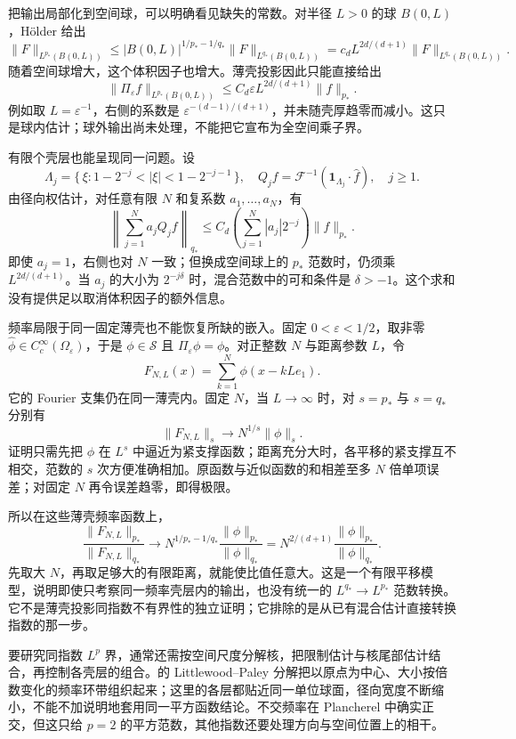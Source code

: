 \ProseParagraphBreak
把输出局部化到空间球，可以明确看见缺失的常数。对半径 \(L>0\) 的球 \(B(0,L)\)，Hölder 给出
\[
 \|F\|_{L^{p_*}(B(0,L))}
 \leq |B(0,L)|^{1/p_*-1/q_*}
       \|F\|_{L^{q_*}(B(0,L))}
 =c_d L^{2d/(d+1)}\|F\|_{L^{q_*}(B(0,L))}.
\]
随着空间球增大，这个体积因子也增大。薄壳投影因此只能直接给出
\[
 \|\Pi_\varepsilon f\|_{L^{p_*}(B(0,L))}
 \leq C_d\varepsilon L^{2d/(d+1)}\|f\|_{p_*}.
\]
例如取 \(L=\varepsilon^{-1}\)，右侧的系数是
\(\varepsilon^{-(d-1)/(d+1)}\)，并未随壳厚趋零而减小。这只是球内估计；球外输出尚未处理，不能把它宣布为全空间乘子界。

\ProseParagraphBreak
有限个壳层也能呈现同一问题。设
\[
 \Lambda_j
 =\{\,\xi:1-2^{-j}<|\xi|<1-2^{-j-1}\,\},\quad
 Q_jf=\mathcal F^{-1}(\mathbf1_{\Lambda_j}\cdot\widehat f),
 \quad j\geq1.
\]
由径向权估计，对任意有限 \(N\) 和复系数 \(a_1,\ldots,a_N\)，有
\[
 \left\|\sum_{j=1}^N a_jQ_jf\right\|_{q_*}
 \leq C_d\left(\sum_{j=1}^N|a_j|2^{-j}\right)\|f\|_{p_*}.
\]
即使 \(a_j=1\)，右侧也对 \(N\) 一致；但换成空间球上的 \(p_*\) 范数时，仍须乘 \(L^{2d/(d+1)}\)。当 \(a_j\) 的大小为 \(2^{-j\delta}\) 时，混合范数中的可和条件是 \(\delta>-1\)。这个求和没有提供足以取消体积因子的额外信息。

\ProseParagraphBreak
频率局限于同一固定薄壳也不能恢复所缺的嵌入。固定 \(0<\varepsilon<1/2\)，取非零
\(\widehat\phi\in C_c^\infty(\Omega_\varepsilon)\)，于是 \(\phi\in\mathcal S\) 且 \(\Pi_\varepsilon\phi=\phi\)。对正整数 \(N\) 与距离参数 \(L\)，令
\[
 F_{N,L}(x)=\sum_{k=1}^N\phi(x-kLe_1).
\]
它的 Fourier 支集仍在同一薄壳内。固定 \(N\)，当 \(L\to\infty\) 时，对 \(s=p_*\) 与 \(s=q_*\) 分别有
\[
 \|F_{N,L}\|_s\longrightarrow N^{1/s}\|\phi\|_s.
\]
证明只需先把 \(\phi\) 在 \(L^s\) 中逼近为紧支撑函数；距离充分大时，各平移的紧支撑互不相交，范数的 \(s\) 次方便准确相加。原函数与近似函数的和相差至多 \(N\) 倍单项误差；对固定 \(N\) 再令误差趋零，即得极限。

\ProseParagraphBreak
所以在这些薄壳频率函数上，
\[
 \frac{\|F_{N,L}\|_{p_*}}{\|F_{N,L}\|_{q_*}}
 \longrightarrow
 N^{1/p_*-1/q_*}\frac{\|\phi\|_{p_*}}{\|\phi\|_{q_*}}
 =N^{2/(d+1)}\frac{\|\phi\|_{p_*}}{\|\phi\|_{q_*}}.
\]
先取大 \(N\)，再取足够大的有限距离，就能使比值任意大。这是一个有限平移模型，说明即使只考察同一频率壳层内的输出，也没有统一的 \(L^{q_*}\to L^{p_*}\) 范数转换。它不是薄壳投影同指数不有界性的独立证明；它排除的是从已有混合估计直接转换指数的那一步。

\ProseParagraphBreak
要研究同指数 \(L^p\) 界，通常还需按空间尺度分解核，把限制估计与核尾部估计结合，再控制各壳层的组合。的 Littlewood--Paley 分解把以原点为中心、大小按倍数变化的频率环带组织起来；这里的各层都贴近同一单位球面，径向宽度不断缩小，不能不加说明地套用同一平方函数结论。不交频率在 Plancherel 中确实正交，但这只给 \(p=2\) 的平方范数，其他指数还要处理方向与空间位置上的相干。

